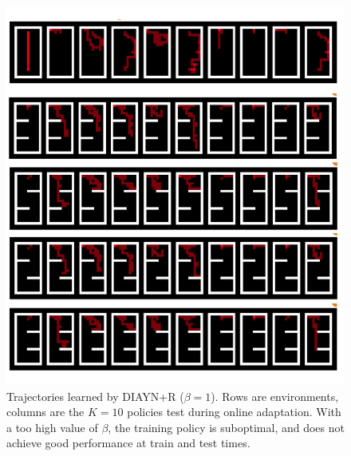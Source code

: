 \begin{figure}[h!]
    \centering
    \includegraphics[width=0.75\linewidth]{images/DIAYN1.png}
    \caption{Trajectories learned by DIAYN+R ($\beta=1$).  Rows are environments, columns are the $K=10$ policies test during online adaptation. With a too high value of $\beta$, the training policy is suboptimal, and does not achieve good performance at train and test times.}
    \label{fig:maze4}
\end{figure}